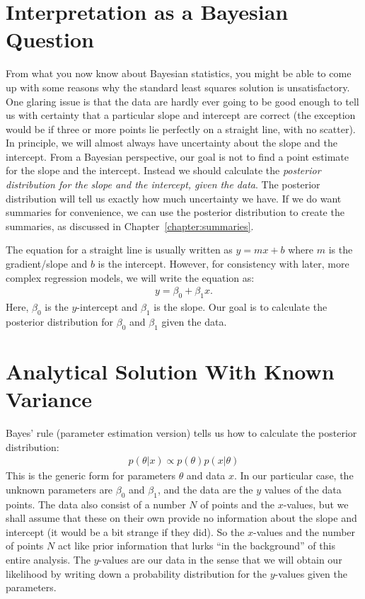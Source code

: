 \section{Interpretation as a Bayesian Question}
From what you now know about Bayesian statistics, you might be able to come up
with some reasons why the standard least squares
solution is unsatisfactory. One glaring issue is that the data are hardly ever
going to be good enough to tell us with certainty that a particular slope and intercept
are correct (the exception would be if three or more points lie perfectly on a straight
line, with no scatter).
In principle, we will almost always have uncertainty about the slope and
the intercept. From a Bayesian perspective, our goal is not to find a point
estimate for the slope and the intercept. Instead we should calculate the
{\it posterior distribution for the slope and the intercept, given the data}.
The posterior distribution will tell us exactly how much uncertainty we have.
If we do want summaries for convenience, we can use the posterior distribution
to create the summaries, as discussed in Chapter~\ref{chapter:summaries}.

The equation for a straight line is usually written as $y = mx + b$ where $m$
is the gradient/slope and $b$ is the intercept. However,
for consistency with later, more complex regression models, we will write the
equation as:
\begin{eqnarray}
y = \beta_0 + \beta_1 x.
\end{eqnarray}
Here, $\beta_0$ is the $y$-intercept and $\beta_1$ is the slope. Our goal is
to calculate the posterior distribution for $\beta_0$ and $\beta_1$ given the
data.

\section{Analytical Solution With Known Variance}
Bayes' rule (parameter estimation version) tells us how to calculate the
posterior distribution:
\begin{eqnarray}
p(\theta|x) \propto p(\theta)p(x|\theta)
\end{eqnarray}
This is the generic form for parameters $\theta$ and data
$x$. In our particular case, the
unknown parameters are $\beta_0$ and $\beta_1$, and the data are the
$y$ values of the data points. The data also consist of a number $N$ of points
and the $x$-values,
but we shall assume that these on their own provide no information about the
slope and intercept (it would be a bit strange if they did). So the $x$-values
and the number of points $N$ act like prior information that lurks ``in the
background'' of this entire analysis. The $y$-values are our data in the sense
that we will obtain our likelihood by writing down a probability distribution
for the $y$-values given the parameters.


